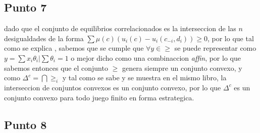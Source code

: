 \documentclass[11pt]{article}
\begin{document}
\subsection{Punto 7}

\begin{flushleft}
    dado que el conjunto de equilibrios correlacionados es la interseccion de las $n$ desigualdades de la forma $\sum \mu(c)(u_i(c)-u_i(c_{-i},d_i))\geq0$,
    por lo que tal como se explica \citep{Boyd_Vandenberghe_2011}, sabemos que se cumple que $\forall y \in \geq$ se puede representar como
    $y=\sum x_i\theta_i|\sum\theta_i=1$ o mejor dicho como una combinaccion \textit{affin}, por lo que sabemos entonces que el conjunto $\geq$ genera siempre un conjunto convexo,
    y como $\Delta^c=\bigcap\geq_i$ y tal como se sabe y se muestra en el mismo libro, la interseccion de conjuntos convexos es un conjunto convexo,
    por lo que $\Delta^c$ es un conjunto convexo para todo juego finito en forma estrategica. 
\end{flushleft}

\subsection{Punto 8}
\end{document}
